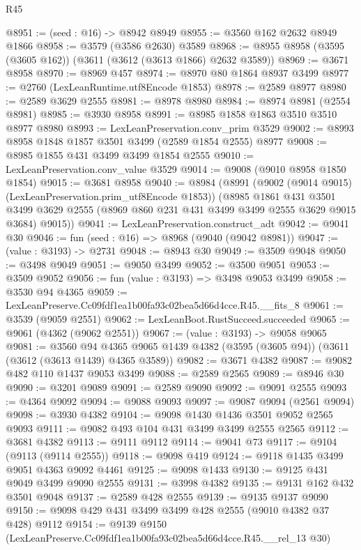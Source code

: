 \begin{lexlean}{R45}
\begin{coremodule}
@8951 := (seed : @16) -> @8942 @8949
@8955 := @3560 @162 @2632 @8949 @1866
@8958 := @3579 (@3586 @2630) @3589
@8968 := @8955 @8958 (@3595 (@3605 @162)) (@3611 (@3612 (@3613 @1866) @2632 @3589))
@8969 := @3671 @8958
@8970 := @8969 @457
@8974 := @8970 @80 @1864 @8937 @3499
@8977 := @2760 (LexLeanRuntime.utf8Encode @1853)
@8978 := @2589 @8977
@8980 := @2589 @3629 @2555
@8981 := @8978 @8980
@8984 := @8974 @8981 (@2554 @8981)
@8985 := @3930 @8958
@8991 := @8985 @1858 @1863 @3510 @3510 @8977 @8980
@8993 := LexLeanPreservation.conv_prim @3529
@9002 := @8993 @8958 @1848 @1857 @3501 @3499 (@2589 @1854 @2555) @8977
@9008 := @8985 @1855 @431 @3499 @3499 @1854 @2555
@9010 := LexLeanPreservation.conv_value @3529
@9014 := @9008 (@9010 @8958 @1850 @1854)
@9015 := @3681 @8958
@9040 := @8984
    (@8991
      (@9002 (@9014 @9015) (LexLeanPreservation.prim_utf8Encode @1853))
      (@8985
        @1861
        @431
        @3501
        @3499
        @3629
        @2555
        (@8969 @860 @231 @431 @3499 @3499 @2555 @3629 @9015 @3684)
        @9015))
@9041 := LexLeanPreservation.construct_adt
@9042 := @9041 @30
@9046 := fun (seed : @16) => @8968 (@9040 (@9042 @8981))
@9047 := (value : @3193) -> @2731
@9048 := @8943 @30
@9049 := @3509 @9048
@9050 := @3498 @9049
@9051 := @9050 @3499
@9052 := @3500 @9051
@9053 := @3509 @9052
@9056 := fun (value : @3193) => @3498 @9053 @3499
@9058 := @3530 @94 @4365
@9059 := LexLeanPreserve.Cc09fdf1ea1b00fa93c02bea5d66d4cce.R45.__fits_8
@9061 := @3539 (@9059 @2551)
@9062 := LexLeanBoot.RustSucceed.succeeded
@9065 := @9061 (@4362 (@9062 @2551))
@9067 := (value : @3193) -> @9058 @9065
@9081 := @3560
    @94
    @4365
    @9065
    @1439
    @4382
    (@3595 (@3605 @94))
    (@3611 (@3612 (@3613 @1439) @4365 @3589))
@9082 := @3671 @4382
@9087 := @9082 @482 @110 @1437 @9053 @3499
@9088 := @2589 @2565
@9089 := @8946 @30
@9090 := @3201 @9089
@9091 := @2589 @9090
@9092 := @9091 @2555
@9093 := @4364 @9092
@9094 := @9088 @9093
@9097 := @9087 @9094 (@2561 @9094)
@9098 := @3930 @4382
@9104 := @9098 @1430 @1436 @3501 @9052 @2565 @9093
@9111 := @9082 @493 @104 @431 @3499 @3499 @2555 @2565
@9112 := @3681 @4382
@9113 := @9111 @9112
@9114 := @9041 @73
@9117 := @9104 (@9113 (@9114 @2555))
@9118 := @9098 @419
@9124 := @9118 @1435 @3499 @9051 @4363 @9092 @4461
@9125 := @9098 @1433
@9130 := @9125 @431 @9049 @3499 @9090 @2555
@9131 := @3998 @4382
@9135 := @9131 @162 @432 @3501 @9048
@9137 := @2589 @428 @2555
@9139 := @9135 @9137 @9090
@9150 := @9098 @429 @431 @3499 @3499 @428 @2555 (@9010 @4382 @37 @428) @9112
@9154 := @9139 @9150 (LexLeanPreserve.Cc09fdf1ea1b00fa93c02bea5d66d4cce.R45.__rel_13 @30)

\end{coremodule}
\end{lexlean}
